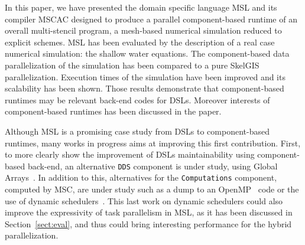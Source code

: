 In this paper, we have presented the domain specific language MSL and its compiler MSCAC designed to produce a parallel component-based runtime of an overall multi-stencil program, \ie a mesh-based numerical simulation reduced to explicit schemes. MSL has been evaluated by the description of a real case numerical simulation: the shallow water equations. The component-based data parallelization of the simulation has been compared to a pure SkelGIS parallelization. Execution times of the simulation have been improved and its scalability has been shown. Those results demonstrate that component-based runtimes may be relevant back-end codes for DSLs. Moreover interests of component-based runtimes has been discussed in the paper.

Although MSL is a promising case study from DSLs to component-based runtimes, many works in progress aims at improving this first contribution. First, to more clearly show the improvement of DSLs maintainability using component-based back-end, an alternative \texttt{DDS} component is under study, using Global Arrays~\cite{Nieplocha:2006:AAP:1125980.1125985}. In addition to this, alternatives for the \texttt{Computations} component, computed by MSC, are under study such as a dump to an OpenMP~\cite{660313} code or the use of dynamic schedulers~\cite{Augonnet2011,Gautier:2013:XRS:2510661.2511383}. This last work on dynamic schedulers could also improve the expressivity of task parallelism in MSL, as it has been discussed in Section~\ref{sect:eval}, and thus could bring interesting performance for the hybrid parallelization.